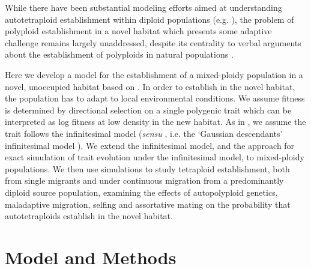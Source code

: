 \documentclass[12pt,a4paper]{article}
\begin{document}
While there have been substantial modeling efforts aimed at understanding
autotetraploid establishment within diploid populations (e.g. \cite{levin1975,
felber1991, felber1997, rausch2005, oswald2011, clo2022c, griswold2021}), the
problem of polyploid establishment in a novel habitat which presents some adaptive
challenge remains largely unaddressed, despite its centrality to verbal
arguments about the establishment of polyploids in natural populations
\citep{kolar2017, vandepeer2021, clo2022d}.

Here we develop a model for the establishment of a mixed-ploidy population in a
novel, unoccupied habitat based on \cite{barton2018}.
In order to establish in the novel habitat, the population has to adapt to
local environmental conditions.
We assume fitness is determined by directional selection on a single polygenic
trait which can be interpreted as log fitness at low density in the new
habitat.
As in \cite{barton2018}, we assume the trait follows the infinitesimal
model (\textit{sensu} \cite{barton2017}, i.e. the `Gaussian descendants'
infinitesimal model \citep{turelli2017}).
We extend the infinitesimal model, and the approach for exact simulation of
trait evolution under the infinitesimal model, to mixed-ploidy populations.
We then use simulations to study tetraploid establishment, both from single
migrants and under continuous migration from a predominantly diploid source
population, examining the effects of autopolyploid genetics,
maladaptive migration, selfing and assortative mating on the probability that
autotetraploids establish in the novel habitat.


\section*{Model and Methods}
\end{document}

